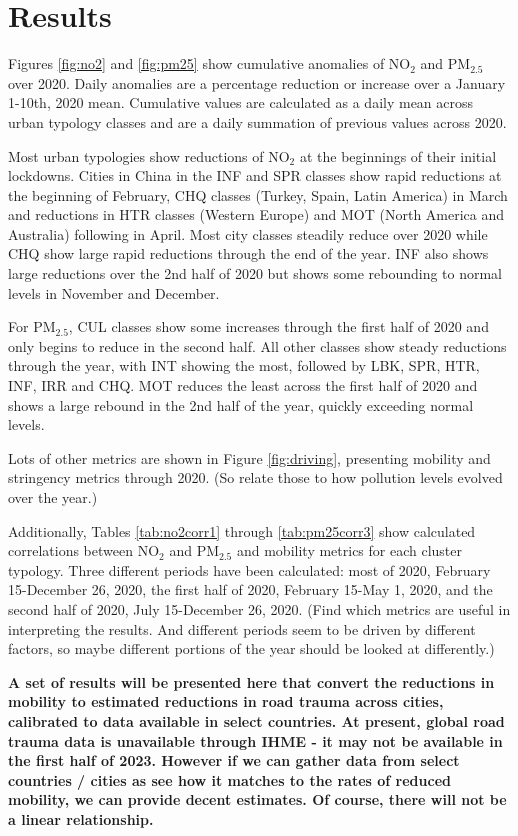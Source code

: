 \documentclass[preprint,12pt]{elsarticle}
\begin{document}
\section*{Results}

Figures \ref{fig:no2} and \ref{fig:pm25} show cumulative anomalies of NO$_{2}$ and PM$_{2.5}$ over 2020. Daily anomalies are a percentage reduction or increase over a January 1-10th, 2020 mean. Cumulative values are calculated as a daily mean across urban typology classes and are a daily summation of previous values across 2020.

Most urban typologies show reductions of NO$_{2}$ at the beginnings of their initial lockdowns. Cities in China in the INF and SPR classes show rapid reductions at the beginning of February, CHQ classes (Turkey, Spain, Latin America) in March and reductions in HTR classes (Western Europe) and MOT (North America and Australia) following in April. Most city classes steadily reduce over 2020 while CHQ show large rapid reductions through the end of the year. INF also shows large reductions over the 2nd half of 2020 but shows some rebounding to normal levels in November and December.

For PM$_{2.5}$, CUL classes show some increases through the first half of 2020 and only begins to reduce in the second half. All other classes show steady reductions through the year, with INT showing the most, followed by LBK, SPR, HTR, INF, IRR and CHQ. MOT reduces the least across the first half of 2020 and shows a large rebound in the 2nd half of the year, quickly exceeding normal levels.

Lots of other metrics are shown in Figure \ref{fig:driving}, presenting mobility and stringency metrics through 2020. (So relate those to how pollution levels evolved over the year.)

Additionally, Tables \ref{tab:no2corr1} through \ref{tab:pm25corr3} show calculated correlations between NO$_{2}$ and PM$_{2.5}$ and mobility metrics for each cluster typology. Three different periods have been calculated: most of 2020, February 15-December 26, 2020, the first half of 2020, February 15-May 1, 2020, and the second half of 2020, July 15-December 26, 2020. (Find which metrics are useful in interpreting the results. And different periods seem to be driven by different factors, so maybe different portions of the year should be looked at differently.)


\textbf{ A set of results will be presented here that convert the reductions in mobility to estimated reductions in road trauma across cities, calibrated to data available in select countries. At present, global road trauma data is unavailable through IHME - it may not be available in the first half of 2023. However if we can gather data from select countries / cities as see how it matches to the rates of reduced mobility, we can provide decent estimates. Of course, there will not be a linear relationship.}
\end{document}
